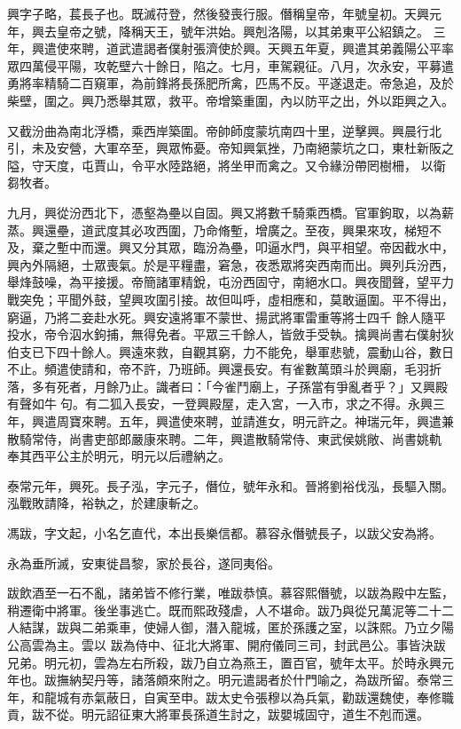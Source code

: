 \begin{pinyinscope}
 興字子略，萇長子也。既滅苻登，然後發喪行服。僭稱皇帝，年號皇初。天興元年，興去皇帝之號，降稱天王，號年洪始。興剋洛陽，以其弟東平公紹鎮之。
 三年，興遣使來聘，道武遣謁者僕射張濟使於興。天興五年夏，興遣其弟義陽公平率眾四萬侵平陽，攻乾壁六十餘日，陷之。七月，車駕親征。八月，次永安，平募遣勇將率精騎二百窺軍，為前鋒將長孫肥所禽，匹馬不反。平遂退走。帝急追，及於柴壁，圍之。興乃悉舉其眾，救平。帝增築重圍，內以防平之出，外以距興之入。



 又截汾曲為南北浮橋，乘西岸築圍。帝帥師度蒙坑南四十里，逆擊興。興晨行北引，未及安營，大軍卒至，興眾怖憂。帝知興氣挫，乃南絕蒙坑之口，東杜新阪之隘，守天度，屯賈山，令平水陸路絕，將坐甲而禽之。又令緣汾帶罔樹柵，
 以衛芻牧者。



 九月，興從汾西北下，憑壑為壘以自固。興又將數千騎乘西橋。官軍鉤取，以為薪蒸。興還壘，道武度其必攻西圍，乃命脩塹，增廣之。至夜，興果來攻，梯短不及，棄之塹中而還。興又分其眾，臨汾為壘，叩逼水門，與平相望。帝因截水中，興內外隔絕，士眾喪氣。於是平糧盡，窘急，夜悉眾將突西南而出。興列兵汾西，舉烽鼓噪，為平接援。帝簡諸軍精銳，屯汾西固守，南絕水口。興夜聞聲，望平力戰突免；平聞外鼓，望興攻圍引接。故但叫呼，虛相應和，莫敢逼圍。平不得出，窮逼，乃將二妾赴水死。興安遠將軍不蒙世、揚武將軍雷重等將士四千
 餘人隨平投水，帝令泅水鉤捕，無得免者。平眾三千餘人，皆斂手受執。擒興尚書右僕射狄伯支已下四十餘人。興遠來救，自觀其窮，力不能免，舉軍悲號，震動山谷，數日不止。頻遣使請和，帝不許，乃班師。興還長安。有雀數萬頭斗於興廟，毛羽折落，多有死者，月餘乃止。識者曰：「今雀鬥廟上，子孫當有爭亂者乎？」又興殿有聲如牛句。有二狐入長安，一登興殿屋，走入宮，一入市，求之不得。永興三年，興遣周寶來聘。五年，興遣使來聘，並請進女，明元許之。神瑞元年，興遣兼散騎常侍，尚書吏部郎嚴康來聘。二年，興遣散騎常侍、東武侯姚敞、尚書姚軌
 奉其西平公主於明元，明元以后禮納之。



 泰常元年，興死。長子泓，字元子，僭位，號年永和。晉將劉裕伐泓，長驅入關。泓戰敗請降，裕執之，於建康斬之。



 馮跋，字文起，小名乞直代，本出長樂信都。慕容永僭號長子，以跋父安為將。



 永為垂所滅，安東徙昌黎，家於長谷，遂同夷俗。



 跋飲酒至一石不亂，諸弟皆不修行業，唯跋恭慎。慕容熙僭號，以跋為殿中左監，稍遷衛中將軍。後坐事逃亡。既而熙政殘虐，人不堪命。跋乃與從兄萬泥等二十二人結謀，跋與二弟乘車，使婦人御，潛入龍城，匿於孫護之室，以誅熙。乃立夕陽公高雲為主。雲以
 跋為侍中、征北大將軍、開府儀同三司，封武邑公。事皆決跋兄弟。明元初，雲為左右所殺，跋乃自立為燕王，置百官，號年太平。於時永興元年也。跋撫納契丹等，諸落頗來附之。明元遣謁者於什門喻之，為跋所留。泰常三年，和龍城有赤氣蔽日，自寅至申。跋太史令張穆以為兵氣，勸跋還魏使，奉修職貢，跋不從。明元詔征東大將軍長孫道生討之，跋嬰城固守，道生不剋而還。




\end{pinyinscope}

